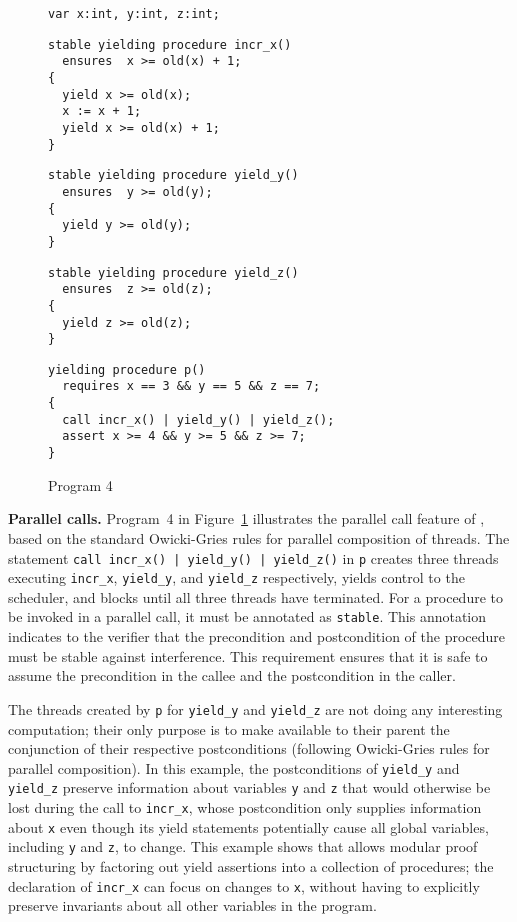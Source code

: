 \begin{figure}
\begin{verbatim}
var x:int, y:int, z:int;
\end{verbatim}
\begin{verbatim}
stable yielding procedure incr_x()
  ensures  x >= old(x) + 1;
{
  yield x >= old(x);
  x := x + 1;
  yield x >= old(x) + 1;
}
\end{verbatim}
\begin{verbatim}
stable yielding procedure yield_y()
  ensures  y >= old(y);
{
  yield y >= old(y);
}
\end{verbatim}
\begin{verbatim}
stable yielding procedure yield_z()
  ensures  z >= old(z);
{
  yield z >= old(z);
}
\end{verbatim}
\begin{verbatim}
yielding procedure p()
  requires x == 3 && y == 5 && z == 7;
{
  call incr_x() | yield_y() | yield_z();
  assert x >= 4 && y >= 5 && z >= 7;
}
\end{verbatim}
\caption{Program 4}
\label{fig:ex4}
\end{figure}

{\bf Parallel calls.}
Program~4 in Figure~\ref{fig:ex4} illustrates the parallel call feature of \civl,
based on the standard Owicki-Gries rules for parallel composition of threads.  
The statement {\tt call incr\_x() | yield\_y() | yield\_z()} in {\tt p} creates three threads 
executing {\tt incr\_x}, {\tt yield\_y}, and {\tt yield\_z} respectively, yields control to the scheduler,
and blocks until all three threads have terminated.
For a procedure to be invoked in a parallel call, it must be annotated as {\tt stable}.
This annotation indicates to the \civl verifier that the precondition and postcondition 
of the procedure must be stable against interference.
This requirement ensures that it is safe to assume the precondition in the callee
and the postcondition in the caller.

The threads created by {\tt p} for {\tt yield\_y} and {\tt yield\_z} are not doing any interesting computation; 
their only purpose is to make available to their parent the conjunction of their respective postconditions
(following Owicki-Gries rules for parallel composition).
In this example, the postconditions of {\tt yield\_y} and {\tt yield\_z} preserve information about variables
{\tt y} and {\tt z} that would otherwise be lost during the call to {\tt incr\_x},
whose postcondition only supplies information about {\tt x} even though its yield statements potentially cause
all global variables, including {\tt y} and {\tt z}, to change.
This example shows that \civl allows modular proof structuring by factoring out yield assertions into a collection of procedures;
the declaration of {\tt incr\_x} can focus on changes to {\tt x},
without having to explicitly preserve invariants about all other variables in the program.

